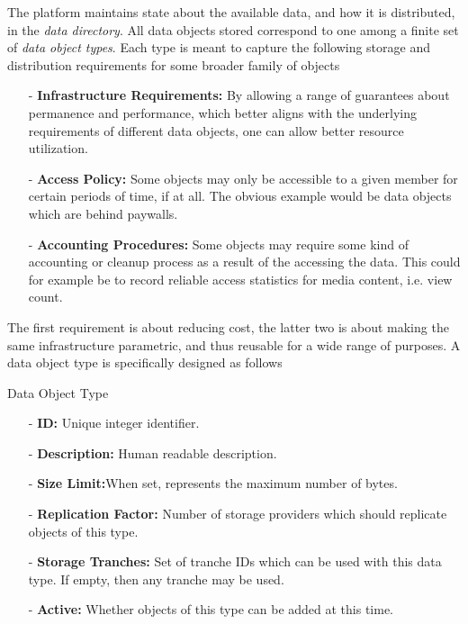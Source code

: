 \documentclass{article}
\newenvironment{concept_box}[1]
    {
    \begin{tcolorbox}
    {\large \textbf{#1} }
    }
    {
    \end{tcolorbox}
    }
\begin{document}
The platform maintains state about the available data, and how it is distributed, in the \textit{data directory}. All data objects stored correspond to one among a finite set of \textit{data object types}. Each type is meant to capture the following storage and distribution requirements for some broader family of objects

\begin{itemize}
  \item[-] \textbf{Infrastructure Requirements:} By allowing a range of guarantees about permanence and performance, which better aligns with the underlying requirements of different data objects, one can allow better resource utilization.

  \item[-] \textbf{Access Policy:} Some objects may only be accessible to a given member for certain periods of time, if at all. The obvious example would be data objects which are behind paywalls.

  \item[-] \textbf{Accounting Procedures:} Some objects may require some kind of accounting or cleanup process as a result of the accessing the data. This could for example be to record reliable access statistics for media content, i.e. view count.

\end{itemize}

The first requirement is about reducing cost, the latter two is about making the same infrastructure parametric, and thus reusable for a wide range of purposes. A data object type is specifically designed as follows  \\

\begin{concept_box}{Data Object Type}

\begin{itemize}
  \item[-] \textbf{ID:} Unique integer identifier.
  \item[-] \textbf{Description:} Human readable description.
  \item[-] \textbf{Size Limit:}When set, represents the maximum number of bytes.
  \item[-] \textbf{Replication Factor:} Number of storage providers which should replicate objects of this type.
  \item[-] \textbf{Storage Tranches:} Set of tranche IDs which can be used with this data type. If empty, then any tranche may be used.
  \item[-] \textbf{Active:} Whether objects of this type can be added at this time.
\end{itemize}
\end{concept_box}
\end{document}
